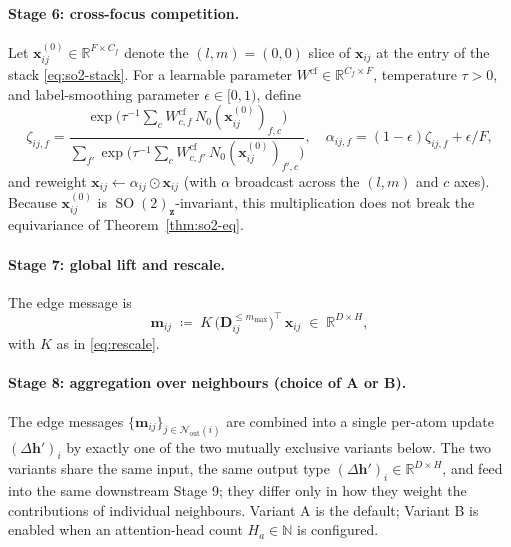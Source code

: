 \documentclass[11pt,a4paper]{article}
\DeclareMathOperator{\SO}{SO}
\newcommand{\R}{\mathbb{R}}
\newcommand{\N}{\mathbb{N}}
\newcommand{\bx}{\bm{x}}
\newcommand{\bz}{\bm{z}}
\newcommand{\bh}{\bm{h}}
\newcommand{\bD}{\bm{D}}
\newcommand{\mmax}{m_{\max}}
\newcommand{\Nb}{\mathcal{N}}
\theoremstyle{plain}
\theoremstyle{definition}
\theoremstyle{remark}
\begin{document}
    \paragraph{Stage 6: cross-focus competition.}
    Let $\bx^{(0)}_{ij}\in\R^{F\times C_f}$ denote the $(l,m)=(0,0)$ slice of
$\bx_{ij}$ at the entry of the stack \eqref{eq:so2-stack}. For a learnable
    parameter $W^{\mathrm{cf}}\in\R^{C_f\times F}$, temperature $\tau>0$, and
    label-smoothing parameter $\epsilon\in[0,1)$, define
    \begin{equation}\label{eq:focuscomp}
        \zeta_{ij,f}=\frac{\exp\!\bigl(\tau^{-1}\sum_{c}W^{\mathrm{cf}}_{c,f}\,N_0(\bx^{(0)}_{ij})_{f,c}\bigr)}{\sum_{f'}\exp\!\bigl(\tau^{-1}\sum_{c}W^{\mathrm{cf}}_{c,f'}\,N_0(\bx^{(0)}_{ij})_{f',c}\bigr)},
        \quad
        \alpha_{ij,f}=(1-\epsilon)\zeta_{ij,f}+\epsilon/F,
    \end{equation}
    and reweight $\bx_{ij}\leftarrow\alpha_{ij}\odot\bx_{ij}$ (with $\alpha$ broadcast across the $(l,m)$ and $c$ axes).
    Because $\bx^{(0)}_{ij}$ is $\SO(2)_{\bz}$-invariant, this multiplication does not break the equivariance of Theorem~\ref{thm:so2-eq}.

    \paragraph{Stage 7: global lift and rescale.}
    The edge message is
    \begin{equation}\label{eq:edge-msg}
        \bm{m}_{ij}\;\coloneqq\;K\,\bigl(\bD_{ij}^{\le\mmax}\bigr)^{\top}\,\bx_{ij}\;\in\;\R^{D\times H},
    \end{equation}
    with $K$ as in \eqref{eq:rescale}.

    \paragraph{Stage 8: aggregation over neighbours (choice of A or B).}
    The edge messages $\{\bm{m}_{ij}\}_{j\in\Nb_{\mathrm{out}}(i)}$ are combined
    into a single per-atom update $(\Delta\bh')_i$ by exactly one of the two
    mutually exclusive variants below. The two variants share the same input, the
    same output type $(\Delta\bh')_i\in\R^{D\times H}$, and feed into the same
    downstream Stage 9; they differ only in how they weight the contributions of
    individual neighbours. Variant A is the default; Variant B is enabled when an
    attention-head count $H_a\in\N$ is configured.
\end{document}
